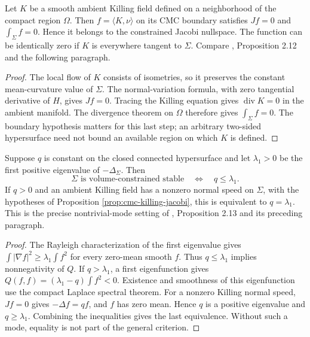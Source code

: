 \begin{proposition}\label{prop:cmc-killing-jacobi}
Let $K$ be a smooth ambient Killing field defined on a neighborhood of the compact region $\Omega$. Then $f=\langle K,\nu\rangle$ on its CMC boundary satisfies $Jf=0$ and $\int_\Sigma f=0$. Hence it belongs to the constrained Jacobi nullspace. The function can be identically zero if $K$ is everywhere tangent to $\Sigma$. Compare \cite{BdCE88}, Proposition 2.12 and the following paragraph.
\end{proposition}
\begin{proof}
The local flow of $K$ consists of isometries, so it preserves the constant mean-curvature value of $\Sigma$. The normal-variation formula, with zero tangential derivative of $H$, gives $Jf=0$. Tracing the Killing equation gives $\operatorname{div}K=0$ in the ambient manifold. The divergence theorem on $\Omega$ therefore gives $\int_\Sigma f=0$. The boundary hypothesis matters for this last step; an arbitrary two-sided hypersurface need not bound an available region on which $K$ is defined.
\end{proof}

\begin{proposition}\label{prop:cmc-constant-potential-test}
Suppose $q$ is constant on the closed connected hypersurface and let $\lambda_1>0$ be the first positive eigenvalue of $-\Delta_\Sigma$. Then
\[
 \Sigma\text{ is volume-constrained stable}\quad\Longleftrightarrow\quad q\leq\lambda_1.
\]
If $q>0$ and an ambient Killing field has a nonzero normal speed on $\Sigma$, with the hypotheses of Proposition \ref{prop:cmc-killing-jacobi}, this is equivalent to $q=\lambda_1$. This is the precise nontrivial-mode setting of \cite{BdCE88}, Proposition 2.13 and its preceding paragraph.
\end{proposition}
\begin{proof}
The Rayleigh characterization of the first eigenvalue gives $\int|\nabla f|^2\geq\lambda_1\int f^2$ for every zero-mean smooth $f$. Thus $q\leq\lambda_1$ implies nonnegativity of $Q$. If $q>\lambda_1$, a first eigenfunction gives $Q(f,f)=(\lambda_1-q)\int f^2<0$. Existence and smoothness of this eigenfunction use the compact Laplace spectral theorem. For a nonzero Killing normal speed, $Jf=0$ gives $-\Delta f=qf$, and $f$ has zero mean. Hence $q$ is a positive eigenvalue and $q\geq\lambda_1$. Combining the inequalities gives the last equivalence. Without such a mode, equality is not part of the general criterion.
\end{proof}

